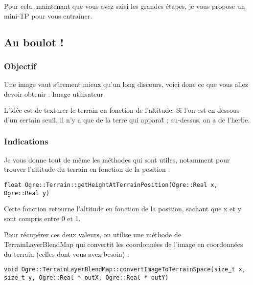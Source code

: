 Pour cela, maintenant que vous avez saisi les grandes \'etapes, je vous propose un mini-TP pour vous entra\^iner.








\subsection{Au boulot !}



\subsubsection{Objectif}

Une image vaut s\^urement mieux qu'un long discours, voici donc ce que vous allez devoir obtenir :
Image utilisateur

L'id\'ee est de texturer le terrain en fonction de l'altitude. Si l'on est en dessous d'un certain seuil, il n'y a que de la terre qui appara\^t ; au-dessus, on a de l'herbe.



\subsubsection{Indications}

Je vous donne tout de m\^eme les m\'ethodes qui sont utiles, notamment pour trouver l'altitude du terrain en fonction de la position :

\begin{lstlisting}[caption={m\'ethode getHeightAtTerrainPosition pour trouver l'altitude du terrain en fonction de la position }]
float Ogre::Terrain::getHeightAtTerrainPosition(Ogre::Real x, Ogre::Real y)
\end{lstlisting}

Cette fonction retourne l'altitude en fonction de la position, sachant que x et y sont compris entre 0 et 1.

Pour r\'ecup\'erer ces deux valeurs, on utilise une m\'ethode de TerrainLayerBlendMap qui convertit les coordonn\'ees de l'image en coordonn\'ees du terrain (celles dont vous avez besoin) :

\begin{lstlisting}[caption={M\'ethode convertImageToTerrainSpace pour convertir les coordonn\'ees de l'image en coordonn\'ees du terrain}]
void Ogre::TerrainLayerBlendMap::convertImageToTerrainSpace(size_t x, size_t y, Ogre::Real * outX, Ogre::Real * outY)
\end{lstlisting}


